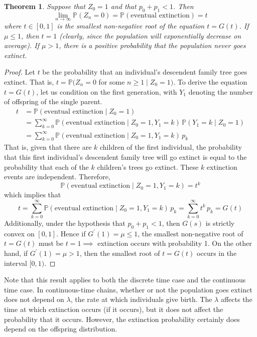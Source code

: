 \documentclass{article}
\newtheorem{theorem}{Theorem}[section]
\theoremstyle{remark}
\theoremstyle{definition}
\begin{document}
\begin{theorem}
Suppose that $Z_0 = 1$ and that $p_0 + p_1 < 1$. Then
\[\lim_{n \rightarrow \infty} \mathbb{P}(Z_n = 0) = \mathbb{P}(\text{eventual extinction}) = t\]
where $t \in [0, 1]$ is the smallest non-negative root of the equation $t = G(t)$. If $\mu \leq 1$, then $t = 1$ (clearly, since the population will exponentially decrease on average). If $\mu > 1$, there is a positive probability that the population never goes extinct. 
\end{theorem}
\begin{proof}
Let $t$ be the probability that an individual's descendent family tree goes extinct. That is, $t = \mathbb{P}(Z_n = 0$ for some $n \geq 1 \; | \; Z_0 = 1)$. To derive the equation $t = G(t)$, let us condition on the first generation, with $Y_1$ denoting the number of offspring of the single parent. 
\begin{align*}
    t & = \mathbb{P}(\text{eventual extinction} \; | \; Z_0 = 1) \\
    & = \sum_{k=0}^\infty \mathbb{P}(\text{eventual extinction} \; | \; Z_0 = 1, Y_1 = k) \, \mathbb{P}(Y_1 = k \; | \; Z_0 = 1) \\
    & = \sum_{k=0}^\infty \mathbb{P}(\text{eventual extinction} \; | \;Z_0 =1, Y_1 = k) \, p_k
\end{align*}
That is, given that there are $k$ children of the first individual, the probability that this first individual's descendent family tree will go extinct is equal to the probability that each of the $k$ children's trees go extinct. These $k$ extinction events are independent. Therefore, 
\[\mathbb{P}(\text{eventual extinction} \; | \;Z_0 = 1, Y_1 = k) = t^k\]
which implies that 
\[t = \sum_{k=0}^\infty \mathbb{P}(\text{eventual extinction} \; | \; Z_0 = 1, Y_1 = k) \, p_k = \sum_{k=0}^\infty t^k \, p_k = G(t)\]
Additionally, under the hypothesis that $p_0 + p_1 < 1$, then $G(s)$ is strictly convex on $[0,1]$. Hence if $G^\prime (1) = \mu \leq 1$, the smallest non-negative root of $t = G(t)$ must be $t=1 \implies$ extinction occurs with probability 1. On the other hand, if $G^\prime (1) = \mu > 1$, then the smallest root of $t = G(t)$ occurs in the interval $[0,1)$. 
\end{proof}

Note that this result applies to both the discrete time case and the continuous time case. In continuous-time chains, whether or not the population goes extinct does not depend on $\lambda$, the rate at which individuals give birth. The $\lambda$ affects the time at which extinction occurs (if it occurs), but it does not affect the probability that it occurs. However, the extinction probability certainly does depend on the offspring distribution. 
\end{document}
